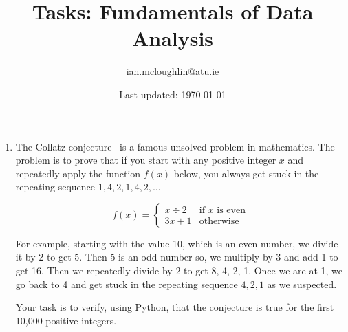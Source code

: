 \documentclass{iansnotes}
\title{Tasks: Fundamentals of Data Analysis}
\author{ian.mcloughlin@atu.ie}
\date{Last updated: \today}
\begin{document}
 
\maketitle
 
\begin{enumerate}
  
  

  \item The Collatz conjecture~\autocite{quantacollatz} is a famous unsolved problem in mathematics. The problem is to prove that if you start with any positive integer $x$ and repeatedly apply the function $f(x)$ below, you always get stuck in the repeating sequence $1,4,2,1,4,2,\ldots$ 
  
  $$ f(x) = \begin{cases}
    x \div 2 & \text{if } x \text{ is even} \\
    3x + 1              & \text{otherwise} 
  \end{cases}$$

  For example, starting with the value 10, which is an even number, we divide it by 2 to get 5.
  Then 5 is an odd number so, we multiply by 3 and add 1 to get 16.
  Then we repeatedly divide by 2 to get 8, 4, 2, 1.
  Once we are at 1, we go back to 4 and get stuck in the repeating sequence $4, 2, 1$ as we suspected.

  Your task is to verify, using Python, that the conjecture is true for the first 10,000 positive integers.
  
\end{enumerate}
\end{document}
